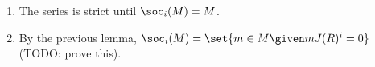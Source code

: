 \begin{enumerate}
	\item The series is strict until $\soc_i(M) = M$.
	\item By the previous lemma, $\soc_i(M) = \set{m \in M\given mJ(R)^i = 0}$
		(TODO: prove this).
\end{enumerate}
